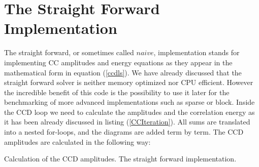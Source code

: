 \documentclass[twoside,english]{uiofysmaster}
\begin{document}
\section{The Straight Forward Implementation}
The straight forward, or sometimes called $naive$, implementation
stands for implementing CC amplitudes and energy equations as they
appear in the mathematical form in equation (\ref{ccdls}). We have
already discussed that the straight forward solver is neither memory
optimized nor CPU efficient. However the incredible benefit of this
code is the possibility to use it later for the benchmarking of more
advanced implementations such as sparse or block. Inside the CCD loop
we need to calculate the amplitudes and the correlation energy as it
has been already discussed in listing (\ref{CCIteration}). All sums
are translated into a nested for-loops, and the diagrams are added
term by term. The CCD amplitudes are calculated in the following way:

\IncMargin{1em}
\begin{algorithm}[H]
	\SetAlgoLined
	
	\BlankLine
	
	\For{$i\leftarrow 1$ \KwTo $N_{\mathrm{Fermi}}$}{
		\For{$j\leftarrow 1$ \KwTo $N_{\mathrm{Fermi}}$}{  %
			\For{$a\leftarrow N_{\mathrm{Fermi}}$ \KwTo $N_{\mathrm{States}}$}{
				\For{$b\leftarrow N_{\mathrm{Fermi}}$ \KwTo $N_{\mathrm{states}}$}{
					V $\leftarrow$ TBME($i,j,a,b$)\\
					Denominator $\leftarrow$ SPE($i$) + SPE($j$) - SPE($a$) - SPE($b$)\\
					\For{$c\leftarrow N_{\mathrm{Fermi}}$ \KwTo $N_{\mathrm{States}}$}{
						\For{$d\leftarrow N_{\mathrm{Fermi}}$ \KwTo $N_{\mathrm{states}}$}{
							Amplitudes($i,j,a,b$) $\leftarrow$ V + $\frac{1}{2}$TBME($a,b,c,d$)AmplitudesOld($c,d,i,j$)	
						}
					}
					Amplitudes($i,j,a,b$) $\leftarrow$ + 6 last terms\\
					Amplitudes($i,j,a,b$) /= Denominator
				}
			}
		}
	}
	\caption{Calculation of the CCD amplitudes. The straight forward implementation.}\label{CCAmplitudesBruteForce}
\end{algorithm}\DecMargin{1em}
\end{document}
